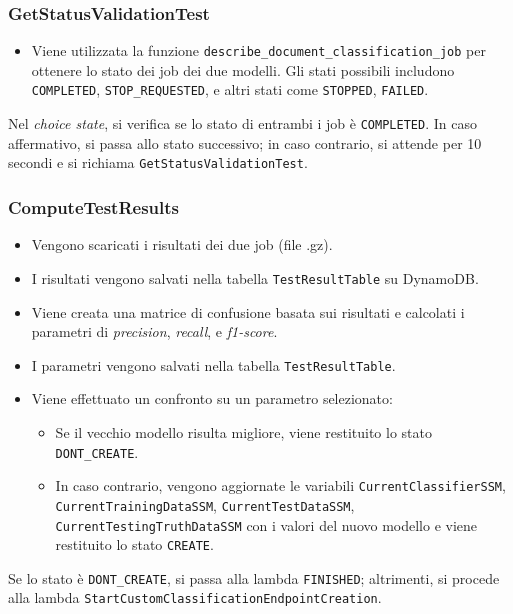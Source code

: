 \subsubsection{GetStatusValidationTest}
\begin{itemize}
  \item Viene utilizzata la funzione \texttt{describe\_document\_classification\_job} per ottenere lo stato dei job dei due modelli. Gli stati possibili includono \texttt{COMPLETED}, \texttt{STOP\_REQUESTED}, e altri stati come \texttt{STOPPED}, \texttt{FAILED}.
\end{itemize}
Nel \textit{choice state}, si verifica se lo stato di entrambi i job è \texttt{COMPLETED}. In caso affermativo, si passa allo stato successivo; in caso contrario, si attende per 10 secondi e si richiama \texttt{GetStatusValidationTest}.

\subsubsection{ComputeTestResults}
\begin{itemize}
  \item Vengono scaricati i risultati dei due job (file .gz).
  \item I risultati vengono salvati nella tabella \texttt{TestResultTable} su DynamoDB.
  \item Viene creata una matrice di confusione basata sui risultati e calcolati i parametri di \textit{precision}, \textit{recall}, e \textit{f1-score}.
  \item I parametri vengono salvati nella tabella \texttt{TestResultTable}.
  \item Viene effettuato un confronto su un parametro selezionato:
  \begin{itemize}
    \item Se il vecchio modello risulta migliore, viene restituito lo stato \texttt{DONT\_CREATE}.
    \item In caso contrario, vengono aggiornate le variabili \texttt{CurrentClassifierSSM}, \texttt{CurrentTrainingDataSSM}, \texttt{CurrentTestDataSSM}, \texttt{CurrentTestingTruthDataSSM} con i valori del nuovo modello e viene restituito lo stato \texttt{CREATE}.
  \end{itemize} 
\end{itemize}
Se lo stato è \texttt{DONT\_CREATE}, si passa alla lambda \texttt{FINISHED}; altrimenti, si procede alla lambda \texttt{StartCustomClassificationEndpointCreation}.

